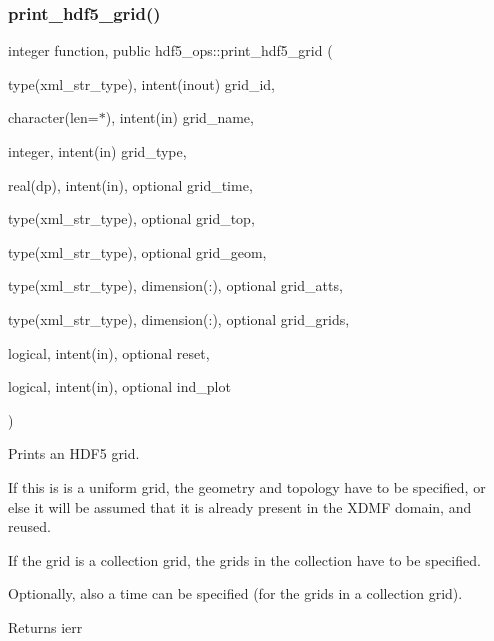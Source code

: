 \subsubsection{\texorpdfstring{print\+\_\+hdf5\+\_\+grid()}{print\_hdf5\_grid()}}
{\footnotesize\ttfamily integer function, public hdf5\+\_\+ops\+::print\+\_\+hdf5\+\_\+grid (\begin{DoxyParamCaption}\item[{type(xml\+\_\+str\+\_\+type), intent(inout)}]{grid\+\_\+id,  }\item[{character(len=$\ast$), intent(in)}]{grid\+\_\+name,  }\item[{integer, intent(in)}]{grid\+\_\+type,  }\item[{real(dp), intent(in), optional}]{grid\+\_\+time,  }\item[{type(xml\+\_\+str\+\_\+type), optional}]{grid\+\_\+top,  }\item[{type(xml\+\_\+str\+\_\+type), optional}]{grid\+\_\+geom,  }\item[{type(xml\+\_\+str\+\_\+type), dimension(\+:), optional}]{grid\+\_\+atts,  }\item[{type(xml\+\_\+str\+\_\+type), dimension(\+:), optional}]{grid\+\_\+grids,  }\item[{logical, intent(in), optional}]{reset,  }\item[{logical, intent(in), optional}]{ind\+\_\+plot }\end{DoxyParamCaption})}



Prints an H\+D\+F5 grid. 

If this is is a uniform grid, the geometry and topology have to be specified, or else it will be assumed that it is already present in the X\+D\+MF domain, and reused.

If the grid is a collection grid, the grids in the collection have to be specified.

Optionally, also a time can be specified (for the grids in a collection grid).

\begin{DoxyReturn}{Returns}
ierr
\end{DoxyReturn}

